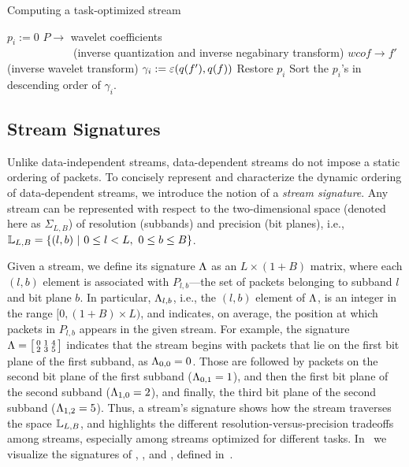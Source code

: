 \begin{algorithm}[h]
  \caption{Computing a task-optimized stream}
  \begin{algorithmic}[1]
			\State $p_i := 0$
      \State $P \rightarrow$ wavelet coefficients \wcof \\
      		\ \ \ \ \ \ \ \ \ \ \ \ (inverse quantization and inverse negabinary transform)
			\State $wcof \rightarrow f'$ (inverse wavelet transform)
			\State $\gamma_i := \err(q(f'),q(f))$			
			\State Restore $p_i$
		\EndFor
		\State Sort the $p_i$'s in descending order of $\gamma_i$.
	\end{algorithmic}
	\label{alg:greedy}
\end{algorithm}

\subsection{Stream Signatures} \label{sec:stream-signature}
Unlike data-independent streams, data-dependent streams do not impose a static ordering of packets.
To concisely represent and characterize the dynamic ordering of data-dependent streams, we introduce
the notion of a \emph{stream signature}. Any stream can be represented with respect to the
two-dimensional space (denoted here as $\Sigma_{L,B}$) of resolution (subbands) and precision (bit
planes), i.e., \mbox{$ {\mathbb L}_{L,B}=\{(l,b)\ |\ 0\leq l < L,\ 0\leq b \leq B\}$.}

Given a stream, we define its signature $\sgn$ as an $L \times (1+B)$ matrix, where each $(l,b)$
element is associated with $P_{l,b}$---the set of packets belonging to subband $l$ and bit plane
$b$. In particular, $\sgn_{l,b}$, i.e., the $(l,b)$ element of $\sgn$, is an integer in the range
$[0, (1+B)\times L)$, and indicates, on average, the position at which packets in $P_{l,b}$ appears
in the given stream. For example, the signature $\sgn=\bigl[ \begin{smallmatrix}0 & 1 & 4\\
2 & 3 & 5\end{smallmatrix}\bigr]$ indicates that the stream begins with packets that lie on the
first bit plane of the first subband, as $\sgn_{0,0}=0$. Those are followed by packets on the second
bit plane of the first subband ($\sgn_{0,1}=1$), and then the first bit plane of the second subband
($\sgn_{1,0}=2$), and finally, the third bit plane of the second subband ($\sgn_{1,2}=5$). Thus, a
stream's signature shows how the stream traverses the space ${\mathbb L}_{L,B}$, and highlights the
different resolution-versus-precision tradeoffs among streams, especially among \sopt streams
optimized for different tasks. In~ we visualize the signatures of
\sbit, \slvl, and \swav, defined in~.

